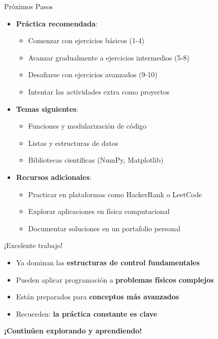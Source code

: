 \documentclass[10pt]{beamer}
\begin{document}
\begin{frame}{Próximos Pasos}
  \begin{itemize}
    \item \textbf{Práctica recomendada}:
      \begin{itemize}
        \item Comenzar con ejercicios básicos (1-4)
        \item Avanzar gradualmente a ejercicios intermedios (5-8)
        \item Desafiarse con ejercicios avanzados (9-10)
        \item Intentar las actividades extra como proyectos
      \end{itemize}
    \item \textbf{Temas siguientes}:
      \begin{itemize}
        \item Funciones y modularización de código
        \item Listas y estructuras de datos
        \item Bibliotecas científicas (NumPy, Matplotlib)
      \end{itemize}
    \item \textbf{Recursos adicionales}:
      \begin{itemize}
        \item Practicar en plataformas como HackerRank o LeetCode
        \item Explorar aplicaciones en física computacional
        \item Documentar soluciones en un portafolio personal
      \end{itemize}
  \end{itemize}
\end{frame}

\begin{frame}
  \huge{\centerline{¡Excelente trabajo!}}
  \vspace{0.3cm}
  \normalsize
  \begin{itemize}
    \item Ya dominan las \textbf{estructuras de control fundamentales}
    \item Pueden aplicar programación a \textbf{problemas físicos complejos}
    \item Están preparados para \textbf{conceptos más avanzados}
    \item Recuerden: \textbf{la práctica constante es clave}
  \end{itemize}
  
  \begin{center}
    \textbf{¡Continúen explorando y aprendiendo!}
  \end{center}
\end{frame}
\end{document}
